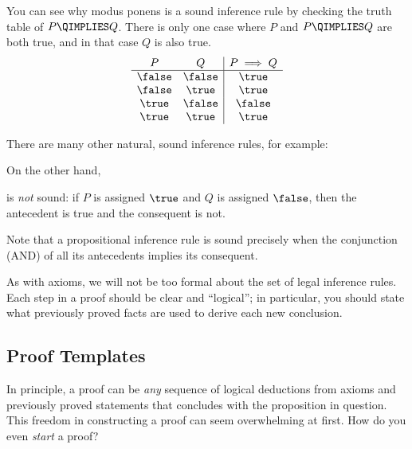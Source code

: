 You can see why modus ponens is a sound inference rule by checking the
truth table of $P\QIMPLIES Q$.  There is only one case where $P$ and
$P \QIMPLIES Q$ are both true, and in that case $Q$ is also true.
\[
\begin{array}{cc|c}
P & Q & P \implies Q \\ \hline
\false & \false & \true \\
\false & \true  & \true \\
\true  & \false & \false \\
\true  & \true  & \true \\
\end{array}
\]

There are many other natural, sound inference rules, for example:
\begin{rul*}
\end{rul*}

\begin{rul*}
\end{rul*}

\begin{rul*}
\end{rul*}

On the other hand,
\begin{rul*}
\end{rul*}
\noindent is \emph{not} sound: if $P$ is assigned $\true$ and $Q$ is assigned
$\false$, then the antecedent is true and the consequent is not.

Note that a propositional inference rule is sound precisely when the conjunction
(AND) of all its antecedents implies its consequent.

As with axioms, we will not be too formal about the set of legal inference
rules.  Each step in a proof should be clear and ``logical''; in
particular, you should state what previously proved facts are used to
derive each new conclusion.

\subsection{Proof Templates}

In principle, a proof can be \textit{any} sequence of logical
deductions from axioms and previously proved statements that concludes
with the proposition in question.  This freedom in constructing a
proof can seem overwhelming at first.  How do you even \textit{start}
a proof?

